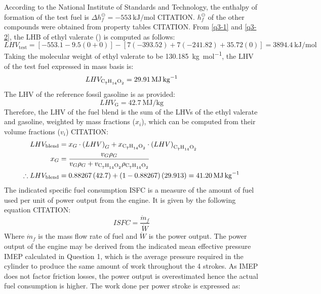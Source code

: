 \documentclass[11pt]{article}
\begin{document}
According to the National Institute of Standards and Technology, the enthalpy of formation of the test fuel is $\Delta h_f^{\ominus} = \SI{-553}{\kilo\joule\per\mol}$ CITATION. $h_f^{\ominus}$ of the other compounds were obtained from property tables CITATION. From \eqref{q3-1} and \eqref{q3-2}, the LHB of ethyl valerate () is computed as follows:
\begin{equation}
    LHV_{\textrm{test}} = \left[-553.1-9.5\left(0+0\right)\right]-\left[7\left(-393.52\right)+7\left(-241.82\right)+35.72\left(0\right)\right] = \SI{3894.4}{\kilo\joule\per\mol}
\end{equation}
Taking the molecular weight of ethyl valerate to be \SI{130.185}{\kilo\gram\per\mole}, the LHV of the test fuel expressed in mass basis is: 
\begin{equation}
    LHV_{\ce{C7H14O2}} = \SI{29.91}{\mega\joule\per\kg}
\end{equation}
The LHV of the reference fossil gasoline is as provided: 
\begin{equation}
    LHV_{\textrm{G}} = \SI{42.7}{\mega\joule\per\kg}
\end{equation}
Therefore, the LHV of the fuel blend is the sum of the LHVs of the ethyl valerate and gasoline, weighted by mass fractions ($x_i$), which can be computed from their volume fractions ($v_i$) CITATION:
\begin{align}
    LHV_{\textrm{blend}} &= x_G \cdot \left(LHV\right)_G + x_{\ce{C7H14O2}} \cdot \left(LHV\right)_{\ce{C7H14O2}}\\
    x_G &= \frac{v_G \rho_G}{v_G \rho_G + v_{\ce{C7H14O2}}\rho_{\ce{C7H14O2}}}\\
    \therefore LHV_{\textrm{blend}} &= 0.88267\left(42.7\right) + \left(1-0.88267\right)\left(29.913\right) = \SI{41.20}{\mega\joule\per\kg}
\end{align}
The indicated specific fuel consumption ISFC is a measure of the amount of fuel used per unit of power output from the engine. It is given by the following equation CITATION:
\begin{equation}
    ISFC = \frac{\dot{m}_f}{\dot{W}} \label{q3-3}
\end{equation}
Where $\dot{m}_f$ is the mass flow rate of fuel and $\dot{W}$ is the power output. The power output of the engine may be derived from the indicated mean effective pressure IMEP calculated in Question 1, which is the average pressure required in the cylinder to produce the same amount of work throughout the 4 strokes. As IMEP does not factor friction losses, the power output is overestimated hence the actual fuel consumption is higher. The work done per power stroke is expressed as: 
\end{document}
